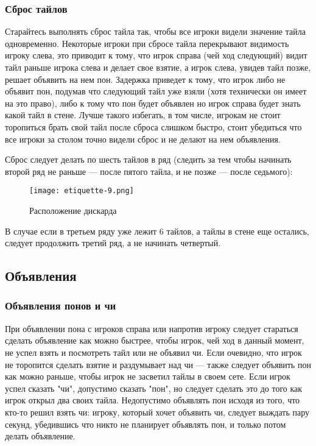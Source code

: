 \subsubsection{Сброс тайлов}

Старайтесь выполнять сброс тайла так, чтобы все игроки видели значение тайла одновременно. Некоторые игроки при сбросе тайла перекрывают видимость игроку слева, это приводит к тому, что игрок справа (чей ход следующий) видит тайл раньше игрока слева и делает свое взятие, а игрок слева, увидев тайл позже, решает объявить на нем пон. Задержка приведет к тому, что игрок либо не объявит пон, подумав что следующий тайл уже взяли (хотя технически он имеет на это право), либо к тому что пон будет объявлен но игрок справа будет знать какой тайл в стене. Лучше такого избегать, в том числе, игрокам не стоит торопиться брать свой тайл после сброса слишком быстро, стоит убедиться что все игроки за столом точно видели сброс и не делают на нем объявления. 

Сброс следует делать по шесть тайлов в ряд (следить за тем чтобы начинать второй ряд не раньше --- после пятого тайла, и не позже --- после седьмого):

\begin{figure}[H]
	\centering
	\texttt{[image: etiquette-9.png]}
	\caption{Расположение дискарда}
\end{figure}

В случае если в третьем ряду уже лежит 6 тайлов, а тайлы в стене еще остались, следует продолжить третий ряд, а не начинать четвертый.

\subsection{Объявления}

\subsubsection{Объявления понов и чи}

При объявлении пона с игроков справа или напротив игроку следует стараться сделать объявление как можно быстрее, чтобы игрок, чей ход в данный момент, не успел взять и посмотреть тайл или не объявил чи. Если очевидно, что игрок не торопится сделать взятие и раздумывает над чи --- также следует объявить пон как можно раньше, чтобы игрок не засветил тайлы в своем сете. Если игрок успел сказать "чи", допустимо сказать "пон", но следует сделать это до того как игрок открыл два своих тайла. Недопустимо объявлять пон исходя из того, что кто-то решил взять чи: игроку, который хочет объявить чи, следует выждать пару секунд, убедившись что никто не планирует объявлять пон, и только потом делать объявление.

